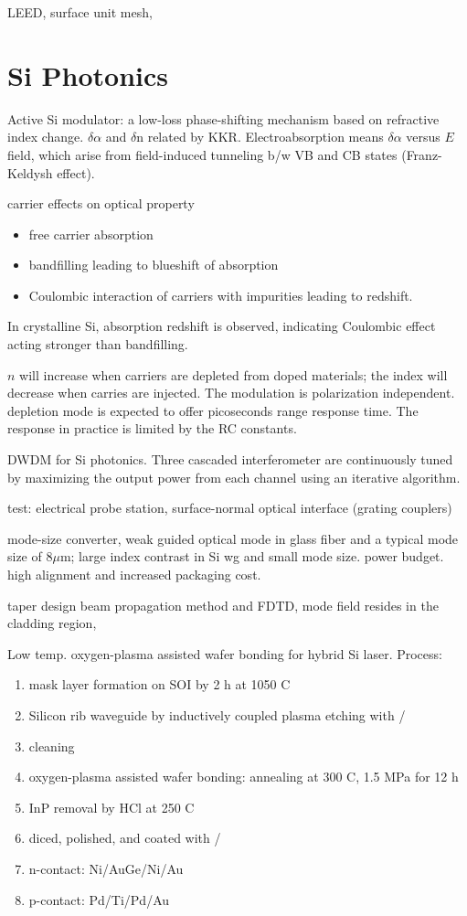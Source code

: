  LEED, surface unit mesh, 


\section{Si Photonics}

Active Si modulator: a low-loss phase-shifting mechanism based on refractive index change.\cite{Soref1987} $\delta\alpha$ and $\delta$n related by KKR. Electroabsorption means $\delta\alpha$ versus $E$ field, which arise from field-induced tunneling b/w VB and CB states (Franz-Keldysh effect). 

carrier effects on optical property
\begin{itemize}
\item free carrier absorption
\item bandfilling leading to blueshift of absorption
\item Coulombic interaction of carriers with impurities leading to redshift.
\end{itemize}
In crystalline Si, absorption redshift is observed, indicating Coulombic effect acting stronger than bandfilling.

$n$ will increase when carriers are depleted from doped materials; the index will decrease when carries are injected. The modulation is polarization independent. depletion mode is expected to offer picoseconds range response time. The response in practice is limited by the RC constants. 

DWDM for Si photonics. \cite{Narasimha2007} Three cascaded interferometer are continuously tuned by maximizing the output power from each channel using an iterative algorithm.

test: electrical probe station, surface-normal optical interface (grating couplers)

mode-size converter, weak guided optical mode in glass fiber and a typical mode size of 8$\mu$m; large index contrast in Si wg and small mode size. power budget.\cite{Moerman1997} high alignment and increased packaging cost. 

taper design beam propagation method and FDTD,\cite{Almeida2003} mode field resides in the  cladding region, 

Low temp. oxygen-plasma assisted wafer bonding for hybrid Si laser.\cite{Park2005} Process:
\begin{enumerate}
\item {} mask layer formation on SOI by 2 h at 1050 C
\item Silicon rib waveguide by inductively coupled plasma etching with /
\item cleaning
\item oxygen-plasma assisted wafer bonding: annealing at 300 C, 1.5 MPa for 12 h
\item InP removal by HCl at 250 C
\item diced, polished, and coated with /
\item n-contact: Ni/AuGe/Ni/Au
\item p-contact: Pd/Ti/Pd/Au
\end{enumerate}

